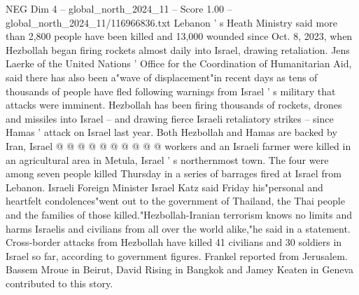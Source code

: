 \begin{textsample}{NEG Dim 4 – global\_north\_2024\_11 – Score 1.00 – global\_north\_2024\_11/116966836.txt}
Lebanon ' s Heath Ministry said more than 2,800 people have been killed and 13,000 wounded since Oct. 8, 2023, when Hezbollah began firing rockets almost daily into Israel, drawing retaliation.
Jens Laerke of the United Nations ' Office for the Coordination of Humanitarian Aid, said there has also been a"wave of displacement"in recent days as tens of thousands of people have fled following warnings from Israel ' s military that attacks were imminent.
Hezbollah has been firing thousands of rockets, drones and missiles into Israel -- and drawing fierce Israeli retaliatory strikes -- since Hamas ' attack on Israel last year.
Both Hezbollah and Hamas are backed by Iran, Israel @ @ @ @ @ @ @ @ @ @ workers and an Israeli farmer were killed in an agricultural area in Metula, Israel ' s northernmost town.
The four were among seven people killed Thursday in a series of barrages fired at Israel from Lebanon.
Israeli Foreign Minister Israel Katz said Friday his"personal and heartfelt condolences"went out to the government of Thailand, the Thai people and the families of those killed."Hezbollah-Iranian terrorism knows no limits and harms Israelis and civilians from all over the world alike,"he said in a statement.
Cross-border attacks from Hezbollah have killed 41 civilians and 30 soldiers in Israel so far, according to government figures.
Frankel reported from Jerusalem.
Bassem Mroue in Beirut, David Rising in Bangkok and Jamey Keaten in Geneva contributed to this story.

\end{textsample}
